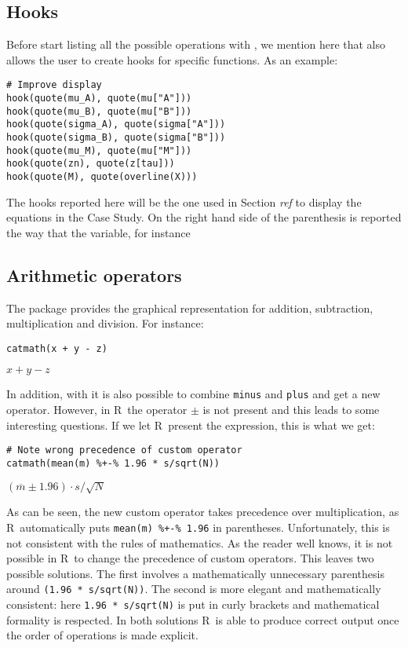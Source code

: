 \hypertarget{hooks}{%
\subsection{Hooks}\label{hooks}}

Before start listing all the possible operations with , we mention here that  also allows the user to create hooks for specific functions. As an example:

\begin{verbatim}
# Improve display
hook(quote(mu_A), quote(mu["A"]))
hook(quote(mu_B), quote(mu["B"]))
hook(quote(sigma_A), quote(sigma["A"]))
hook(quote(sigma_B), quote(sigma["B"]))
hook(quote(mu_M), quote(mu["M"]))
hook(quote(zn), quote(z[tau]))
hook(quote(M), quote(overline(X)))
\end{verbatim}

The hooks reported here will be the one used in Section \emph{ref} to display the equations in the Case Study. On the right hand side of the parenthesis is reported the way that the variable, for instance

\hypertarget{arithmetic-operators}{%
\subsection{Arithmetic operators}\label{arithmetic-operators}}

The  package provides the graphical representation for addition, subtraction, multiplication and division. For instance:

\begin{verbatim}
catmath(x + y - z)
\end{verbatim}

\({{{x}+{y}}-{z}}\)

In addition, with  it is also possible to combine \texttt{minus} and \texttt{plus} and get a new operator. However, in R~the operator \(\pm\) is not present and this leads to some interesting questions. If we let R~present the expression, this is what we get:

\begin{verbatim}
# Note wrong precedence of custom operator
catmath(mean(m) %+-% 1.96 * s/sqrt(N))
\end{verbatim}

\({{\left({\overline{{m}}\pm{1.96}}\right)\cdot{s}}/\sqrt{{N}}}\)

As can be seen, the new custom operator takes precedence over multiplication, as R~automatically puts \texttt{mean(m)\ \%+-\%\ 1.96} in parentheses. Unfortunately, this is not consistent with the rules of mathematics. As the reader well knows, it is not possible in R~to change the precedence of custom operators. This leaves two possible solutions. The first involves a mathematically unnecessary parenthesis around \texttt{(1.96\ *\ s/sqrt(N))}. The second is more elegant and mathematically consistent: here \texttt{1.96\ *\ s/sqrt(N)} is put in curly brackets and mathematical formality is respected. In both solutions R~is able to produce correct output once the order of operations is made explicit.

